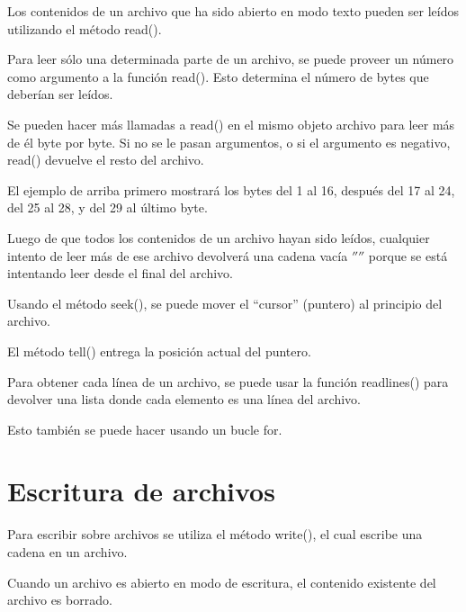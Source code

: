 \documentclass{report}
\newcommand{\doble}[1]{``#1''}
\begin{document}
Los contenidos de un archivo que ha sido abierto en modo texto pueden ser leídos utilizando el método read().


Para leer sólo una determinada parte de un archivo, se puede proveer un número como argumento a la función read(). Esto determina el número de bytes que deberían ser leídos.\smallskip

Se pueden hacer más llamadas a read() en el mismo objeto archivo para leer más de él byte por byte. Si no se le pasan argumentos, o si el argumento es negativo, read() devuelve el resto del archivo.


El ejemplo de arriba primero mostrará los bytes del 1 al 16, después del 17 al 24, del 25 al 28, y del 29 al último byte.\smallskip

Luego de que todos los contenidos de un archivo hayan sido leídos, cualquier intento de leer más de ese archivo devolverá una cadena vacía $''$$''$ porque se está intentando leer desde el final del archivo.


Usando el método seek(), se puede mover el \doble{cursor} (puntero) al principio del archivo.


El método tell() entrega la posición actual del puntero.


Para obtener cada línea de un archivo, se puede usar la función readlines() para devolver una lista donde cada elemento es una línea del archivo.


Esto también se puede hacer usando un bucle for.


\section{Escritura de archivos}

Para escribir sobre archivos se utiliza el método write(), el cual escribe una cadena en un archivo.


Cuando un archivo es abierto en modo de escritura, el contenido existente del archivo es borrado.
\end{document}
